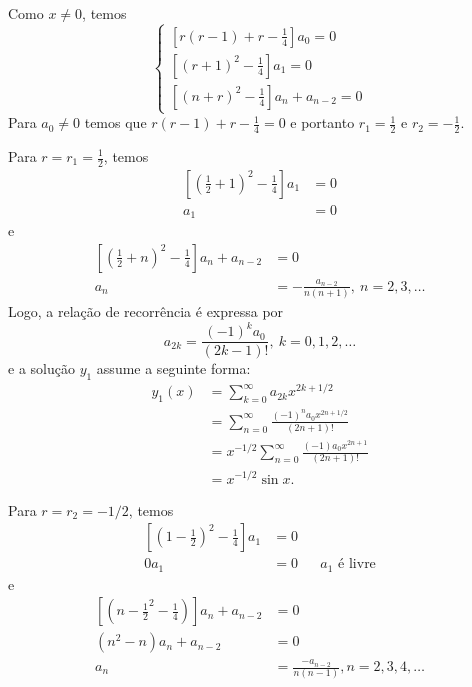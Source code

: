 \documentclass[a4paper,12pt, leqno, answers]{exam}
\begin{document}
\begin{questions}
\begin{solution}
        Como $x \neq 0$, temos
        \[
        \begin{cases}
            \left[ r \left( r - 1 \right) + r - \frac{1}{4} \right] a_0 = 0 \\
            \left[ \left( r + 1 \right)^2 - \frac{1}{4} \right] a_1 = 0 \\
            \left[ \left(n + r \right)^2 - \frac{1}{4} \right] a_n + a_{n-2} = 0
        \end{cases}
        \]
        Para $a_0 \neq 0$ temos que $r \left( r - 1 \right) + r - \frac{1}{4} = 0$ e portanto $r_1 = \frac{1}{2}$ e $r_2 = - \frac{1}{2}$.

        Para $r = r_1 = \frac{1}{2}$, temos
        \begin{align*}
            \left[ \left( \frac{1}{2} + 1 \right)^2 - \frac{1}{4} \right] a_1 &= 0 \\
            a_1 &= 0
        \end{align*}
        e
        \begin{align*}
            \left[ \left( \frac{1}{2} + n \right)^2 - \frac{1}{4} \right] a_n + a_{n - 2} &=0 \\
            a_n &= - \frac{a_{n - 2}}{n \left( n + 1 \right)}, \ n = 2, 3, \ldots
        \end{align*}
        Logo, a rela\c{c}\~{a}o de recorr\^{e}ncia \'{e} expressa por
        \[
        a_{2k} = \frac{\left( -1 \right)^k a_0}{\left( 2k - 1 \right)!}, \ k = 0, 1, 2, \ldots
        \]
        e a solu\c{c}\~{a}o $y_1$ assume a seguinte forma:
        \begin{align*}
            y_1\left( x \right) &= \sum_{k = 0}^\infty a_{2k} x^{2k + 1/2} \\
            &= \sum_{n = 0}^\infty \frac{\left( -1 \right)^n a_0 x^{2n + 1/2}}{\left( 2n + 1 \right)!} \\
            &= x^{-1/2} \sum_{n = 0}^\infty \frac{\left( -1 \right) a_0 x^{2n + 1}}{\left( 2 n + 1 \right)!} \\
            &= x^{-1/2} \sin x.
        \end{align*}

        Para $r = r_2 = -1/2$, temos
        \begin{align*}
            \left[ \left( 1 - \frac{1}{2} \right)^2 - \frac{1}{4} \right] a_1 &= 0 \\
            0a_1 &= 0 && a_1 \text{ \'{e} livre}
        \end{align*}
        e
        \begin{align*}
            \left[ \left( n - \frac{1}{2}^2 - \frac{1}{4} \right) \right] a_n + a_{n - 2} &= 0 \\
            \left( n^2 - n \right) a_n + a_{n - 2} &= 0 \\
            a_n &= \frac{-a_{n - 2}}{n (n - 1)}, n = 2, 3, 4, \ldots
        \end{align*}


\end{solution}
\end{questions}
\end{document}
